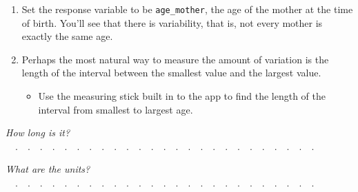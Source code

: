 \documentclass[nofonts,]{tufte-handout}
\providecommand{\tightlist}{%
  \setlength{\itemsep}{0pt}\setlength{\parskip}{0pt}}
\begin{document}
\begin{enumerate}
\def\labelenumi{\arabic{enumi}.}
\item
  Set the response variable to be \texttt{age\_mother}, the age of the
  mother at the time of birth. You'll see that there is variability,
  that is, not every mother is exactly the same age.
\item
  Perhaps the most natural way to measure the amount of variation is the
  length of the interval between the smallest value and the largest
  value.

  \begin{itemize}
  \tightlist
  \item
    Use the measuring stick built in to the app to find the length of
    the interval from smallest to largest age.
  \end{itemize}
\end{enumerate}

\emph{How long is it?}
~~.~~.~~.~~.~~.~~.~~.~~.~~.~~.~~.~~.~~.~~.~~.~~.~~.~~.~~.~~.~~.~~.~~.~~.~~.
~

\emph{What are the units?}
~~.~~.~~.~~.~~.~~.~~.~~.~~.~~.~~.~~.~~.~~.~~.~~.~~.~~.~~.~~.~~.~~.~~.~~.~~.
~
\end{document}
